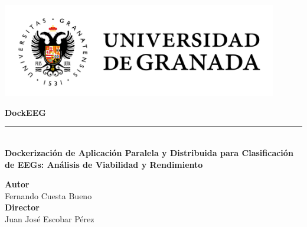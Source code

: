 \begin{titlepage}


    \setlength{\centeroffset}{-0.5\oddsidemargin}
    \addtolength{\centeroffset}{0.5\evensidemargin}
    \thispagestyle{empty}

    \noindent\hspace*{\centeroffset}\begin{minipage}{\textwidth}

        \centering


        \vspace{3.3cm}

        \includegraphics[width=0.9\textwidth]{imagenes/logo_ugr.jpg}
        \vspace{0.5cm}


        {\Huge\bfseries DockEEG\\
        }
        \noindent\rule[-1ex]{\textwidth}{3pt}\\[3.5ex]
        {\large\bfseries Dockerización de Aplicación Paralela y Distribuida para Clasificación de EEGs: Análisis de Viabilidad y Rendimiento\\[4cm]}
    \end{minipage}

    \vspace{2.5cm}
    \noindent\hspace*{\centeroffset}\begin{minipage}{\textwidth}
        \centering

        \textbf{Autor}\\ {Fernando Cuesta Bueno}\\[2.5ex]
        \textbf{Director}\\
        {Juan José Escobar Pérez}\\[2cm]
    \end{minipage}


\end{titlepage}


